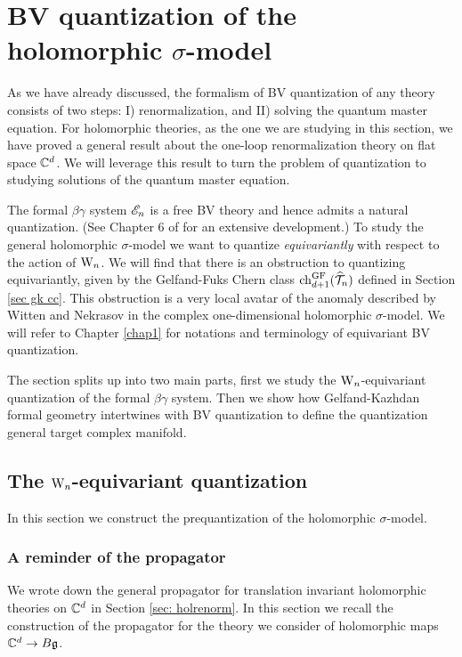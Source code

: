 \section{BV quantization of the holomorphic $\sigma$-model}

As we have already discussed, the formalism of BV quantization of any theory consists of two steps: I) renormalization, and II) solving the quantum master equation. 
For holomorphic theories, as the one we are studying in this section, we have proved a general result about the one-loop renormalization theory on flat space $\mathbb C^d$. 
We will leverage this result to turn the problem of quantization to studying solutions of the quantum master equation.

The formal $\beta\gamma$ system $\mathscr E_n$ is a free BV theory and hence admits a natural quantization.
(See Chapter 6 of \cite{GwThesis} for an extensive development.)  
To study the general holomorphic $\sigma$-model we want to quantize \emph{equivariantly} with respect to the action of ${{\rm W}_n}$.
We will find that there is an obstruction to quantizing equivariantly, 
given by the Gelfand-Fuks Chern class ${\rm ch}_{d+1}^{{\rm GF}}(\widehat{\mathcal T}_n)$ defined in Section \ref{sec gk cc}. 
This obstruction is a very local avatar of the anomaly described by Witten and Nekrasov \cite{WittenCDO,Nek} in the complex one-dimensional holomorphic $\sigma$-model.
We will refer to Chapter \ref{chap1} for notations and terminology of equivariant BV quantization.

The section splits up into two main parts, first we study the ${{\rm W}_n}$-equivariant quantization of the formal $\beta\gamma$ system.
Then we show how Gelfand-Kazhdan formal geometry intertwines with BV quantization to define the quantization general target complex manifold. 

\subsection{The ${{\rm W}_n}$-equivariant quantization}

In this section we construct the prequantization of the holomorphic $\sigma$-model.

\subsubsection{A reminder of the propagator}

We wrote down the general propagator for translation invariant holomorphic theories on $\mathbb C^d$ in Section \ref{sec: holrenorm}.
In this section we recall the construction of the propagator for the theory we consider of holomorphic maps $\mathbb C^d \to B \mathfrak g$. 

